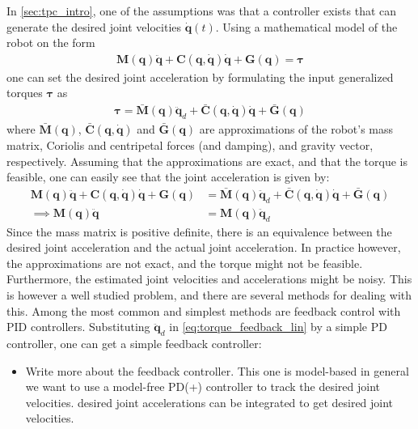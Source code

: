 In \autoref{sec:tpc_intro}, one of the assumptions was that a controller exists
that can generate the desired joint velocities $\dot{\bm{q}}(t)$. Using a
mathematical model of the robot on the form
\begin{align}
    \bm{M}(\bm{q}) \ddot{\bm{q}} + \bm{C}(\bm{q}, \dot{\bm{q}}) \dot{\bm{q}} + \bm{G}(\bm{q}) = \bm{\tau}
\end{align}
one can set the desired joint acceleration by formulating the input generalized
torques $\bm{\tau}$ as
\begin{align}
    \bm{\tau} = \bar{\bm{M}}(\bm{q}) \ddot{\bm{q}}_d + \bar{\bm{C}}(\bm{q}, \dot{\bm{q}}) \dot{\bm{q}} + \bar{\bm{G}}(\bm{q}) \label{eq:torque_feedback_lin}
\end{align}
where $\bar{\bm{M}}(\bm{q})$, $\bar{\bm{C}}(\bm{q}, \dot{\bm{q}})$ and
$\bar{\bm{G}}(\bm{q})$ are approximations of the robot's mass matrix, Coriolis
and centripetal forces (and damping), and gravity vector, respectively. Assuming
that the approximations are exact, and that the torque is feasible, one can easily
see that the joint acceleration is given by:
\begin{subequations}
\begin{align}
    \bm{M}(\bm{q}) \ddot{\bm{q}} + \bm{C}(\bm{q}, \dot{\bm{q}}) \dot{\bm{q}} + \bm{G}(\bm{q}) &= 
    \bar{\bm{M}}(\bm{q}) \ddot{\bm{q}}_d + \bar{\bm{C}}(\bm{q}, \dot{\bm{q}}) \dot{\bm{q}} + \bar{\bm{G}}(\bm{q}) \\
    \implies \bm{M}(\bm{q}) \ddot{\bm{q}} &= \bm{M}(\bm{q}) \ddot{\bm{q}}_d
\end{align}
\end{subequations}
Since the mass matrix is positive definite, there is an equivalence between the
desired joint acceleration and the actual joint acceleration. In practice
however, the approximations are not exact, and the torque might not be feasible.
Furthermore, the estimated joint velocities and accelerations might be noisy.
This is however a well studied problem, and there are several methods for
dealing with this. Among the most common and simplest methods are feedback control
with PID controllers. Substituting $\ddot{\bm{q}}_d$ in \autoref{eq:torque_feedback_lin}
by a simple PD controller, one can get a simple feedback controller:
{
    \color{red}
    \begin{itemize}
        \item Write more about the feedback controller. This one is model-based
            in general we want to use a model-free PD(+) controller to track
            the desired joint velocities. desired joint accelerations can be
            integrated to get desired joint velocities.
    \end{itemize}
}


